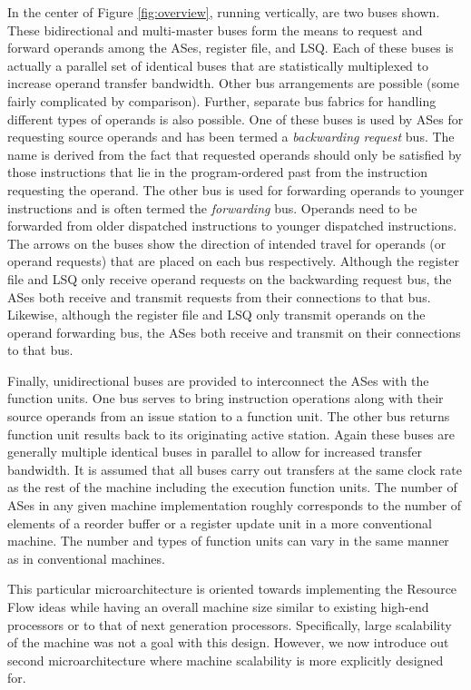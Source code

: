 \documentclass{book}
\begin{document}
In the center of Figure \ref{fig:overview},
running vertically, are two buses shown.
These bidirectional and multi-master buses 
form the means to request and forward operands
among the ASes, register file, and LSQ.
Each of these buses is actually a parallel set of identical buses
that are statistically multiplexed to increase operand transfer
bandwidth.  
Other bus arrangements are possible (some fairly complicated by
comparison).  
Further, separate bus fabrics for handling
different types of operands is also possible.
One of these buses is used by ASes
for requesting source operands and
has been termed a \textit{backwarding request} bus.
The name is derived from the fact that requested operands should
only be satisfied by those instructions that lie in the program-ordered
past from the instruction requesting the operand.
The other bus is used for forwarding operands to younger instructions
and is often termed the \textit{forwarding} bus.
Operands need to be forwarded from older dispatched
instructions to younger dispatched instructions.
The arrows on the buses show the direction of intended travel
for operands (or operand requests) that are placed on each bus
respectively.  Although the register file and LSQ only receive
operand requests on the backwarding request bus, the ASes
both receive and transmit requests from their connections to that
bus.  Likewise, although the register file and LSQ only transmit
operands on the operand forwarding bus, the ASes
both receive and transmit on their connections to that bus.

Finally, unidirectional buses are provided to interconnect
the ASes with the function units.
One bus serves to bring instruction
operations along with their source operands from an issue
station to a function unit.
The other bus returns function unit results back to its
originating active station.
Again these buses are generally multiple identical buses in
parallel to allow for increased transfer bandwidth.
It is assumed that all buses carry out transfers at the same
clock rate as the rest of the machine including the execution
function units.
The number of ASes in
any given machine implementation roughly corresponds to the
number of elements of a reorder buffer or a register update unit
in a more conventional machine.
The number and types of function units can vary in the same
manner as in conventional machines.

This particular microarchitecture is oriented towards
implementing the Resource Flow ideas while having an overall
machine size similar to existing high-end processors or to that
of next generation processors.
Specifically, large scalability of the machine was not a goal
with this design.
However, we now introduce out second microarchitecture where
machine scalability is more explicitly designed for.
%
%
\end{document}
